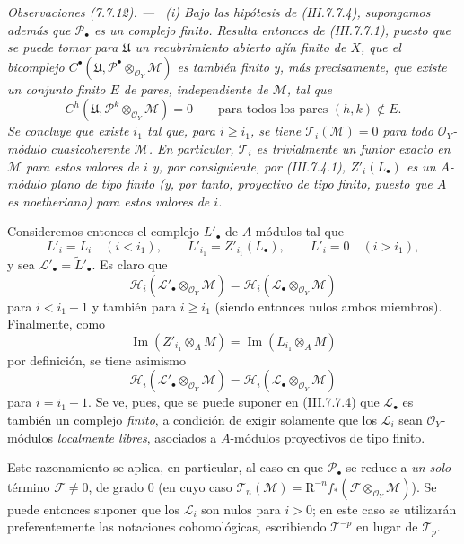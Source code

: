 \documentclass[10pt,oneside]{book}
\newcommand{\sref}[2][]{\textup{(#2)}}
\newenvironment{remarks}[1][]{\par\medskip\noindent\itshape Observaciones (#1). ---\ }{\par}
\begin{document}
\begin{remarks}[7.7.12]
\label{III.7.7.12}
\textnormal{(i)} Bajo las hipótesis de \sref{III.7.7.4}, supongamos además que
$\mathscr P_\bullet$ es un complejo \emph{finito}. Resulta entonces de
\sref{III.7.7.1}, puesto que se puede tomar para $\mathfrak U$ un
recubrimiento abierto afín \emph{finito} de $X$, que el bicomplejo
$C^\bullet(\mathfrak U,
\mathscr P^\bullet\otimes_{\mathscr O_Y}\mathscr M)$ es también \emph{finito} y, más
precisamente, que existe un conjunto finito $E$ de pares, \emph{independiente
de $\mathscr M$}, tal que
\[
  C^h(\mathfrak U,\mathscr P^k\otimes_{\mathscr O_Y}\mathscr M)=0
  \qquad\text{para todos los pares }(h,k)\notin E.
\]
Se concluye que existe $i_1$ tal que, para $i\geq i_1$, se tiene
$\mathscr T_i(\mathscr M)=0$ para \emph{todo} $\mathscr O_Y$-módulo
cuasicoherente $\mathscr M$. En particular, $\mathscr T_i$ es trivialmente un
funtor exacto en $\mathscr M$ para estos valores de $i$ y, por consiguiente,
por \sref{III.7.4.1}, $Z'_i(L_\bullet)$ es un $A$-módulo \emph{plano} de tipo
finito (y, por tanto, \emph{proyectivo} de tipo finito, puesto que $A$ es
noetheriano) para estos valores de $i$.

Consideremos entonces el complejo $L'_\bullet$ de $A$-módulos tal que
\[
  L'_i=L_i\quad(i<i_1),
  \qquad
  L'_{i_1}=Z'_{i_1}(L_\bullet),
  \qquad
  L'_i=0\quad(i>i_1),
\]
y sea $\mathscr L'_\bullet=\widetilde{L}'_\bullet$. Es claro que
\[
  \mathscr H_i(\mathscr L'_\bullet\otimes_{\mathscr O_Y}\mathscr M)
  =
  \mathscr H_i(\mathscr L_\bullet\otimes_{\mathscr O_Y}\mathscr M)
\]
para $i<i_1-1$ y también para $i\geq i_1$ (siendo entonces nulos ambos
miembros). Finalmente, como
\[
  \operatorname{Im}(Z'_{i_1}\otimes_A M)
  =
  \operatorname{Im}(L_{i_1}\otimes_A M)
\]
por definición, se tiene asimismo
\[
  \mathscr H_i(\mathscr L'_\bullet\otimes_{\mathscr O_Y}\mathscr M)
  =
  \mathscr H_i(\mathscr L_\bullet\otimes_{\mathscr O_Y}\mathscr M)
\]
para $i=i_1-1$. Se ve, pues, que se puede suponer en \sref{III.7.7.4} que
$\mathscr L_\bullet$ es también un complejo \emph{finito}, a condición de
exigir solamente que los $\mathscr L_i$ sean $\mathscr O_Y$-módulos
\emph{localmente libres}, asociados a $A$-módulos proyectivos de tipo finito.

Este razonamiento se aplica, en particular, al caso en que
$\mathscr P_\bullet$ se reduce a \emph{un solo} término $\mathscr F\ne0$, de
grado $0$ (en cuyo caso
$\mathscr T_n(\mathscr M)=\mathrm R^{-n}f_*
(\mathscr F\otimes_{\mathscr O_Y}\mathscr M)$). Se puede entonces suponer que
los $\mathscr L_i$ son nulos para $i>0$; en este caso se utilizarán
preferentemente las notaciones cohomológicas, escribiendo $\mathscr T^{-p}$ en
lugar de $\mathscr T_p$.


\end{remarks}
\end{document}
